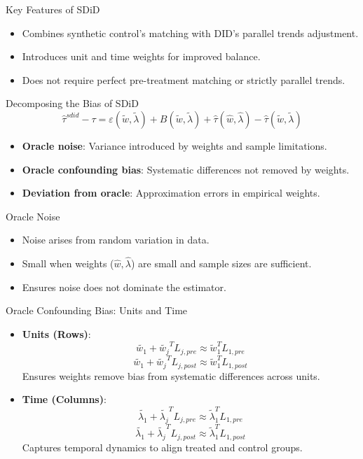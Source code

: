 \documentclass{beamer}
\begin{document}
\begin{frame}{Key Features of SDiD}

\begin{itemize}
    \item Combines synthetic control's matching with DID's parallel trends adjustment.
    \item Introduces unit and time weights for improved balance.
    \item Does not require perfect pre-treatment matching or strictly parallel trends.
\end{itemize}

\end{frame}




\begin{frame}{Decomposing the Bias of SDiD}
\[
\widehat{\tau}^{sdid} - \tau = \varepsilon(\widetilde{w}, \widetilde{\lambda}) + B(\widetilde{w}, \widetilde{\lambda}) + \widehat{\tau}(\widehat{w},\widehat{\lambda}) - \widehat{\tau}(\widetilde{w},\widetilde{\lambda})
\]
\begin{itemize}
\item \textbf{Oracle noise}: Variance introduced by weights and sample limitations.
\item \textbf{Oracle confounding bias}: Systematic differences not removed by weights.
\item \textbf{Deviation from oracle}: Approximation errors in empirical weights.
\end{itemize}
\end{frame}

\begin{frame}{Oracle Noise}
\begin{itemize}
\item Noise arises from random variation in data.
\item Small when weights (\(\hat{w}, \hat{\lambda}\)) are small and sample sizes are sufficient.
\item Ensures noise does not dominate the estimator.
\end{itemize}
\end{frame}

\begin{frame}{Oracle Confounding Bias: Units and Time}
\begin{itemize}
\item \textbf{Units (Rows)}:
    \[
    \widetilde{w_1} + \widetilde{w_{j}}^TL_{j,pre} \approx \widetilde{w}_1^TL_{1,pre}
    \]
    \[
    \widetilde{w_1} + \widetilde{w_{j}}^TL_{j,post} \approx \widetilde{w}_1^TL_{1,post}
    \]
    Ensures weights remove bias from systematic differences across units.
\item \textbf{Time (Columns)}:
    \[
    \widetilde{\lambda_1} + \widetilde{\lambda_{j}}^TL_{j,pre} \approx \widetilde{\lambda}_1^TL_{1,pre}
    \]
    \[
    \widetilde{\lambda_1} + \widetilde{\lambda_{j}}^TL_{j,post} \approx \widetilde{\lambda}_1^TL_{1,post}
    \]
    Captures temporal dynamics to align treated and control groups.
\end{itemize}
\end{frame}
\end{document}
